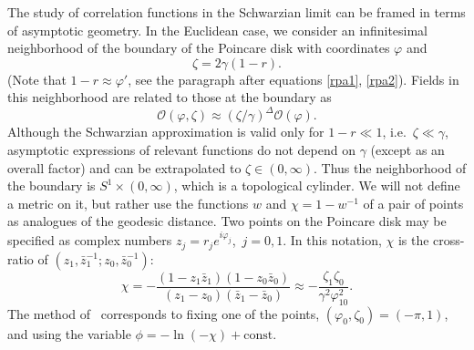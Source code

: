 \documentclass[11pt]{article}
\newcommand{\vp}{\varphi}
\newcommand{\calO}{\mathcal{O}}
\newcommand{\const}{\mathrm{const}}
\begin{document}
The study of correlation functions in the Schwarzian limit can be framed in terms of asymptotic geometry. In the Euclidean case, we consider an infinitesimal neighborhood of the boundary of the Poincare disk with coordinates $\vp$ and
\begin{equation}
\zeta=2\gamma(1-r).
\end{equation}
(Note that $1-r\approx\vp'$, see the paragraph after equations \eqref{rpa1}, \eqref{rpa2}). Fields in this neighborhood are related to those at the boundary as
\begin{equation}
\calO(\vp,\zeta)\approx(\zeta/\gamma)^{\Delta}\calO(\vp).
\end{equation}
Although the Schwarzian approximation is valid only for $1-r\ll 1$, i.e.\ $\zeta\ll\gamma$, asymptotic expressions of relevant functions do not depend on $\gamma$ (except as an overall factor) and can be extrapolated to $\zeta\in(0,\infty)$. Thus the neighborhood of the boundary is $S^1\times(0,\infty)$, which is a topological cylinder. We will not define a metric on it, but rather use the functions $w$ and $\chi=1-w^{-1}$ of a pair of points as analogues of the geodesic distance. Two points on the Poincare disk may be specified as complex numbers $z_j=r_je^{i\vp_j}$,\, $j=0,1$. In this notation, $\chi$ is the cross-ratio of $(z_1,\bar{z}_1^{-1};z_0,\bar{z}_0^{-1})$:
\begin{equation}
\chi=-\frac{(1-z_1\bar{z}_1)(1-z_0\bar{z}_0)}{(z_1-z_0)(\bar{z}_1-\bar{z}_0)}
\approx -\frac{\zeta_1\zeta_0}{\gamma^2\vp_{10}^2}.
\end{equation}
The method of~\cite{BaAlKa16,BaAlKa17} corresponds to fixing one of the points, $(\vp_0,\zeta_0)=(-\pi,1)$, and using the variable $\phi=-\ln(-\chi)+\const$.
\end{document}
